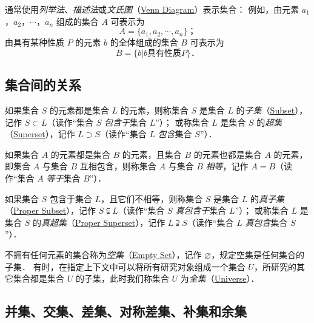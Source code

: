 通常使用\emph{列举法}、\emph{描述法}或\emph{文氏图}（\href{http://mathworld.wolfram.com/VennDiagram.html}{Venn Diagram}）表示集合：
例如，由元素 $a_1$，$a_2$，$\cdots$，$a_n$ 组成的集合 $A$ 可表示为
\[
A = \{ a_1, a_2, \cdots, a_n \} \text{；}
\]
由具有某种性质 $P$ 的元素 $b$ 的全体组成的集合 $B$ 可表示为
\[
B = \{ b | b \text{具有性质} P \} \text{．}
\]

\subsection{集合间的关系}

如果集合 $S$ 的元素都是集合 $L$ 的元素，则称集合 $S$ 是集合 $L$ 的\emph{子集}（\href{http://mathworld.wolfram.com/Subset.html}{Subset}），记作 $S\subset{}L$（读作``集合 $S$ \emph{包含于}集合 $L$''）；
或称集合 $L$ 是集合 $S$ 的\emph{超集}（\href{http://mathworld.wolfram.com/Superset.html}{Superset}），记作 $L\supset{}S$（读作``集合 $L$ \emph{包含}集合 $S$''）．

如果集合 $A$ 的元素都是集合 $B$ 的元素，且集合 $B$ 的元素也都是集合 $A$ 的元素，即集合 $A$ 与集合 $B$ 互相包含，则称集合 $A$ 与集合 $B$ \emph{相等}，记作 $A=B$（读作``集合 $A$ \emph{等于}集合 $B$''）．

如果集合 $S$ 包含于集合 $L$，且它们不相等，则称集合 $S$ 是集合 $L$ 的\emph{真子集}（\href{http://mathworld.wolfram.com/ProperSubset.html}{Proper Subset}），记作 $S\subsetneqq{}L$（读作``集合 $S$ \emph{真包含于}集合 $L$''）；
或称集合 $L$ 是集合 $S$ 的\emph{真超集}（\href{http://mathworld.wolfram.com/ProperSuperset.html}{Proper Superset}），记作 $L\supsetneqq{}S$（读作``集合 $L$ \emph{真包含}集合 $S$''）．

不拥有任何元素的集合称为\emph{空集}（\href{http://mathworld.wolfram.com/EmptySet.html}{Empty Set}），记作 $\varnothing$，规定空集是任何集合的子集．
有时，在指定上下文中可以将所有研究对象组成一个集合 $U$，所研究的其它集合都是集合 $U$ 的子集，此时我们称集合 $U$ 为\emph{全集}（\href{http://mathworld.wolfram.com/UniversalSet.html}{Universe}）．

\subsection{并集、交集、差集、对称差集、补集和余集}

